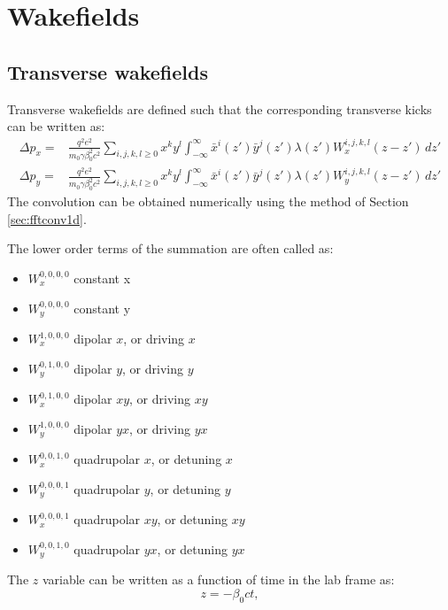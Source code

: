 \section{Wakefields}

\subsection{Transverse wakefields}

Transverse wakefields are defined such that the corresponding transverse kicks can be written as:
\begin{align}
    \Delta p_x = 
     & \frac{q^2 e^2}{m_0 \gamma \beta_0^2 c^2}
     \sum_{i,j,k,l \geq 0} 
        x^k y^l\int_{-\infty}^\infty
        \bar{x}^i(z')\bar{y}^j(z')\lambda(z')W^{i,j,k,l}_{x}(z - z') \, dz'
        \label{eq:wake_kick_x}\\
    \Delta p_y =
     & \frac{q^2 e^2}{m_0 \gamma \beta_0^2 c^2}
     \sum_{i,j,k,l \geq 0} 
        x^k y^l\int_{-\infty}^\infty
        \bar{x}^i(z')\bar{y}^j(z')\lambda(z')W^{i,j, k, l}_{y}(z - z') \, dz'
        \label{eq:wake_kick_y}
\end{align}
The convolution can be obtained numerically using the method of Section \ref{sec:fftconv1d}.



The lower order terms of the summation are often called as:
\begin{itemize}
    \item $W_x^{0,0,0,0}$ constant x
    \item $W_y^{0,0,0,0}$ constant y
    \item $W_x^{1,0,0,0}$ dipolar $x$, or driving $x$
    \item $W_y^{0,1,0,0}$ dipolar $y$, or driving $y$ 
    \item $W_x^{0,1,0,0}$ dipolar $xy$, or driving $xy$
    \item $W_y^{1,0,0,0}$ dipolar $yx$, or driving $yx$
    \item $W_x^{0,0,1,0}$ quadrupolar $x$, or detuning $x$
    \item $W_y^{0,0,0,1}$ quadrupolar $y$, or detuning $y$
    \item $W_x^{0,0,0,1}$ quadrupolar $xy$, or detuning $xy$
    \item $W_y^{0,0,1,0}$ quadrupolar $yx$, or detuning $yx$
\end{itemize}

The $z$ variable can be written as a function of time in the lab frame as:
\begin{equation}\label{eq:z}
    z = -\beta_0 c t,
\end{equation}

